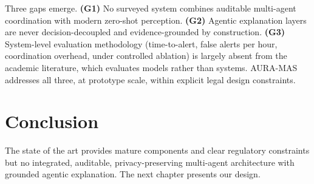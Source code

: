 Three gaps emerge. \textbf{(G1)} No surveyed system combines auditable multi-agent coordination with modern zero-shot perception. \textbf{(G2)} Agentic explanation layers are never decision-decoupled and evidence-grounded by construction. \textbf{(G3)} System-level evaluation methodology (time-to-alert, false alerts per hour, coordination overhead, under controlled ablation) is largely absent from the academic literature, which evaluates models rather than systems. AURA-MAS addresses all three, at prototype scale, within explicit legal design constraints.

\section{Conclusion}

The state of the art provides mature components and clear regulatory constraints but no integrated, auditable, privacy-preserving multi-agent architecture with grounded agentic explanation. The next chapter presents our design.
